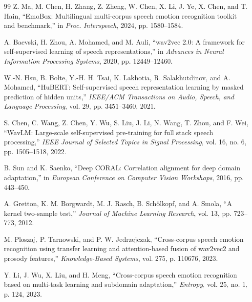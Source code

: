 \documentclass[9pt,twocolumn,letterpaper]{article}
\begin{document}
\begin{thebibliography}{99}
Z. Ma, M. Chen, H. Zhang, Z. Zheng, W. Chen, X. Li, J. Ye, X. Chen, and T. Hain,
``EmoBox: Multilingual multi-corpus speech emotion recognition toolkit and benchmark,''
in \textit{Proc. Interspeech}, 2024, pp. 1580--1584.

A. Baevski, H. Zhou, A. Mohamed, and M. Auli,
``wav2vec 2.0: A framework for self-supervised learning of speech representations,''
in \textit{Advances in Neural Information Processing Systems}, 2020, pp. 12449--12460.

W.-N. Hsu, B. Bolte, Y.-H. H. Tsai, K. Lakhotia, R. Salakhutdinov, and A. Mohamed,
``HuBERT: Self-supervised speech representation learning by masked prediction of hidden units,''
\textit{IEEE/ACM Transactions on Audio, Speech, and Language Processing}, vol. 29, pp. 3451--3460, 2021.

S. Chen, C. Wang, Z. Chen, Y. Wu, S. Liu, J. Li, N. Wang, T. Zhou, and F. Wei,
``WavLM: Large-scale self-supervised pre-training for full stack speech processing,''
\textit{IEEE Journal of Selected Topics in Signal Processing}, vol. 16, no. 6, pp. 1505--1518, 2022.

B. Sun and K. Saenko,
``Deep CORAL: Correlation alignment for deep domain adaptation,''
in \textit{European Conference on Computer Vision Workshops}, 2016, pp. 443--450.

A. Gretton, K. M. Borgwardt, M. J. Rasch, B. Sch\"olkopf, and A. Smola,
``A kernel two-sample test,''
\textit{Journal of Machine Learning Research}, vol. 13, pp. 723--773, 2012.

M. Ploszaj, P. Tarnowski, and P. W. Jedrzejczak,
``Cross-corpus speech emotion recognition using transfer learning and attention-based fusion of wav2vec2 and prosody features,''
\textit{Knowledge-Based Systems}, vol. 275, p. 110676, 2023.

Y. Li, J. Wu, X. Liu, and H. Meng,
``Cross-corpus speech emotion recognition based on multi-task learning and subdomain adaptation,''
\textit{Entropy}, vol. 25, no. 1, p. 124, 2023.

\end{thebibliography}
\end{document}
